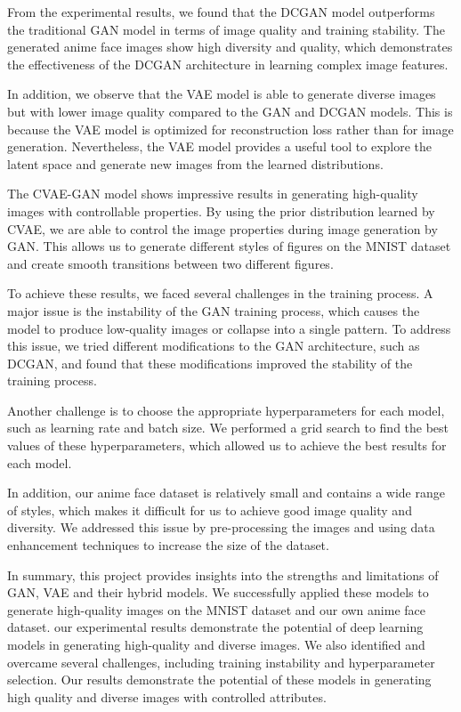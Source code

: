 \documentclass[
]{article}
\begin{document}
From the experimental results, we found that the DCGAN model outperforms
the traditional GAN model in terms of image quality and training
stability. The generated anime face images show high diversity and
quality, which demonstrates the effectiveness of the DCGAN architecture
in learning complex image features.

In addition, we observe that the VAE model is able to generate diverse
images but with lower image quality compared to the GAN and DCGAN
models. This is because the VAE model is optimized for reconstruction
loss rather than for image generation. Nevertheless, the VAE model
provides a useful tool to explore the latent space and generate new
images from the learned distributions.

The CVAE-GAN model shows impressive results in generating high-quality
images with controllable properties. By using the prior distribution
learned by CVAE, we are able to control the image properties during
image generation by GAN. This allows us to generate different styles of
figures on the MNIST dataset and create smooth transitions between two
different figures.

To achieve these results, we faced several challenges in the training
process. A major issue is the instability of the GAN training process,
which causes the model to produce low-quality images or collapse into a
single pattern. To address this issue, we tried different modifications
to the GAN architecture, such as DCGAN, and found that these
modifications improved the stability of the training process.

Another challenge is to choose the appropriate hyperparameters for each
model, such as learning rate and batch size. We performed a grid search
to find the best values of these hyperparameters, which allowed us to
achieve the best results for each model.

In addition, our anime face dataset is relatively small and contains a
wide range of styles, which makes it difficult for us to achieve good
image quality and diversity. We addressed this issue by pre-processing
the images and using data enhancement techniques to increase the size of
the dataset.

In summary, this project provides insights into the strengths and
limitations of GAN, VAE and their hybrid models. We successfully applied
these models to generate high-quality images on the MNIST dataset and
our own anime face dataset. our experimental results demonstrate the
potential of deep learning models in generating high-quality and diverse
images. We also identified and overcame several challenges, including
training instability and hyperparameter selection. Our results
demonstrate the potential of these models in generating high quality and
diverse images with controlled attributes.
\end{document}
